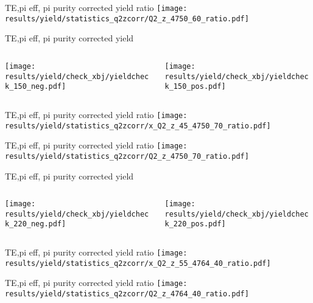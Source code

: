 \begin{frame}{TE,pi eff, pi purity corrected yield ratio}
\texttt{[image: results/yield/statistics\_q2zcorr/Q2\_z\_4750\_60\_ratio.pdf]}
\end{frame}
\begin{frame}{TE,pi eff, pi purity corrected yield}
\begin{columns}
\begin{column}[T]{0.5\textwidth}
\texttt{[image: results/yield/check\_xbj/yieldcheck\_150\_neg.pdf]}
\end{column}
\begin{column}[T]{0.5\textwidth}
\texttt{[image: results/yield/check\_xbj/yieldcheck\_150\_pos.pdf]}
\end{column}
\end{columns}
\end{frame}
\begin{frame}{TE,pi eff, pi purity corrected yield ratio}
\texttt{[image: results/yield/statistics\_q2zcorr/x\_Q2\_z\_45\_4750\_70\_ratio.pdf]}
\end{frame}
\begin{frame}{TE,pi eff, pi purity corrected yield ratio}
\texttt{[image: results/yield/statistics\_q2zcorr/Q2\_z\_4750\_70\_ratio.pdf]}
\end{frame}
\begin{frame}{TE,pi eff, pi purity corrected yield}
\begin{columns}
\begin{column}[T]{0.5\textwidth}
\texttt{[image: results/yield/check\_xbj/yieldcheck\_220\_neg.pdf]}
\end{column}
\begin{column}[T]{0.5\textwidth}
\texttt{[image: results/yield/check\_xbj/yieldcheck\_220\_pos.pdf]}
\end{column}
\end{columns}
\end{frame}
\begin{frame}{TE,pi eff, pi purity corrected yield ratio}
\texttt{[image: results/yield/statistics\_q2zcorr/x\_Q2\_z\_55\_4764\_40\_ratio.pdf]}
\end{frame}
\begin{frame}{TE,pi eff, pi purity corrected yield ratio}
\texttt{[image: results/yield/statistics\_q2zcorr/Q2\_z\_4764\_40\_ratio.pdf]}
\end{frame}
